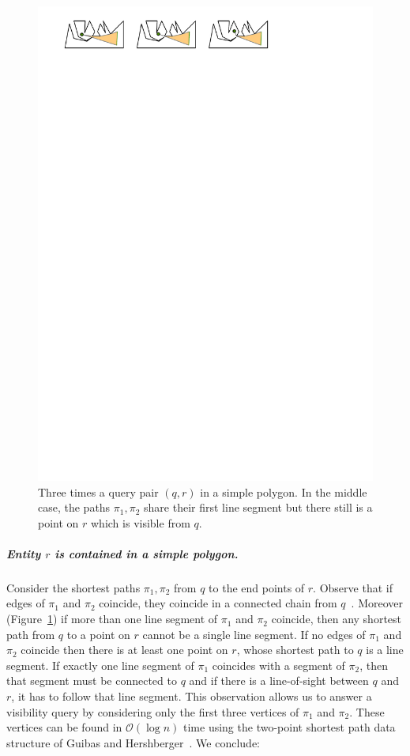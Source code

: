 \documentclass[UKenglish]{lipics-v2019}
\newcommand{\mkmcal}[1]{\ensuremath{\mathcal{#1}}\xspace}
\renewcommand{\O}{\mkmcal{O}}
\begin{document}
\begin{figure}[t]
    \centering
    \includegraphics[]{../funnel}
    \caption{Three times a query pair $(q,r)$ in a simple polygon. In the middle case, the paths $\pi_1, \pi_2$ share their first line segment but there still is a point on $r$ which is visible from $q$.}
    \label{fig:funnel}
\end{figure}

\subparagraph{Entity $r$ is contained in a simple polygon.} Consider
the shortest paths $\pi_1, \pi_2$ from $q$ to the end points of
$r$. Observe that if edges of $\pi_1$ and $\pi_2$ coincide, they
coincide in a connected chain from $q$~\cite{guibas1989optimal}. Moreover
(Figure~\ref{fig:funnel}) if more than one line segment of $\pi_1$ and
$\pi_2$ coincide, then any shortest path from $q$ to a point on $r$
cannot be a single line segment. If no edges of $\pi_1$ and $\pi_2$
coincide then there is at least one point on $r$, whose shortest path
to $q$ is a line segment. If exactly one line segment of $\pi_1$
coincides with a segment of $\pi_2$, then that segment must be
connected to $q$ and if there is a line-of-sight between $q$ and $r$,
it has to follow that line segment. This observation allows us to
answer a visibility query by considering only the first three vertices
of $\pi_1$ and $\pi_2$. These vertices can be found in $\O(\log n)$
time using the two-point shortest path data structure of Guibas and
Hershberger~\cite{guibas1989optimal}. We conclude:
\end{document}
